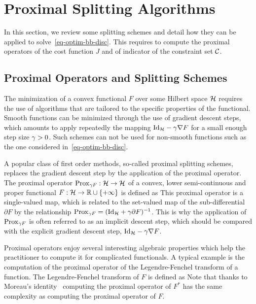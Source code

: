 
\section{Proximal Splitting Algorithms}
\label{sec-proximal}

In this section, we review some splitting schemes and detail how they can be applied to solve~\eqref{eq-optim-bb-disc}. This requires to compute the proximal operators of the cost function $J$ and of indicator of the constraint set $\mathcal{C}$. 

\subsection{Proximal Operators and Splitting Schemes}

The minimization of a convex functional $F$ over some Hilbert space $\mathcal{H}$ requires the use of algorithms that are tailored to the specific properties of the functional. Smooth functions can be minimized through the use of gradient descent steps, which amounts to apply repeatedly the mapping $\mathrm{Id}_{\mathcal{H}} - \gamma \nabla F$ for a small enough step size $\gamma>0$. Such schemes can not be used for non-smooth functions such as the one considered in~\eqref{eq-optim-bb-disc}. 

A popular class of first order methods, so-called proximal splitting schemes, replaces the gradient descent step by the application of the proximal operator. The proximal operator $\operatorname{Prox}_{\gamma F} : \mathcal{H} \rightarrow \mathcal{H}$ of a convex, lower semi-continuous and proper functional $F : \mathcal{H} \rightarrow \mathbb{R} \cup \{+\infty\}$ is defined as
This proximal operator is a single-valued map, which is related to the set-valued map of the sub-differential $\partial F$ by the relationship $\operatorname{Prox}_{\gamma F} = ( \mathrm{Id}_{\mathcal{H}} + \gamma \partial F )^{-1}$. This is why the application of $\operatorname{Prox}_{\gamma F}$ is often referred to as an implicit descent step, which should be compared with the explicit gradient descent step, $\mathrm{Id}_{\mathcal{H}} - \gamma \nabla F$. 

Proximal operators enjoy several interesting algebraic properties which help the practitioner to compute it for complicated functionals. A typical example is the computation of the proximal operator of the Legendre-Fenchel transform of a function. The Legendre-Fenchel transform of $F$ is defined as
Note that thanks to Moreau's identity~\cite{Moreau1965}
computing the proximal operator of $F^*$ has the same complexity as computing the proximal operator of $F$. 

